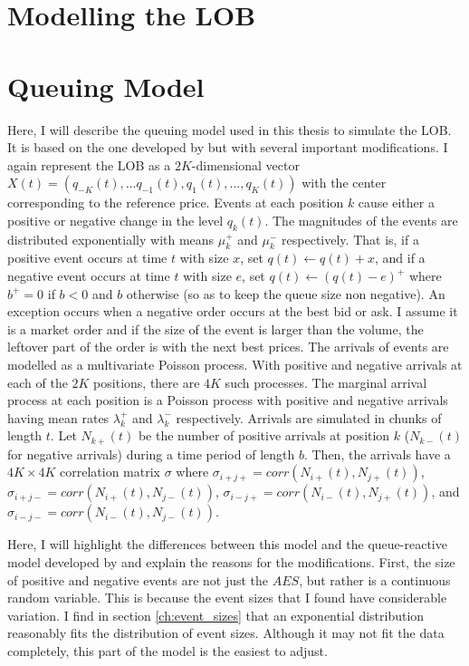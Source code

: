 \section{Modelling the LOB}

\section{Queuing Model}\label{ch:queue_model}
Here, I will describe the queuing model used in this thesis to simulate the LOB. It is based on the one developed by \cite{A6} but with several important modifications. I again represent the LOB as a $2K$-dimensional vector $X(t) = (q_{-K}(t), … q_{-1}(t), q_1(t), … , q_K(t))$ with the center corresponding to the reference price. Events at each position $k$ cause either a positive or negative change in the level $q_k(t)$. The magnitudes of the events are distributed exponentially with means $\mu^+_k$ and $\mu^-_k$ respectively. That is, if a positive event occurs at time $t$ with size $x$, set $q(t) \leftarrow q(t) + x$, and if a negative event occurs at time $t$ with size $e$, set $q(t) \leftarrow (q(t) - e)^+$ where $b^+ = 0$ if $b < 0$ and $b$ otherwise (so as to keep the queue size non negative). An exception occurs when a negative order occurs at the best bid or ask. I assume it is a market order and if the size of the event is larger than the volume, the leftover part of the order is with the next best prices. The arrivals of events are modelled as a multivariate Poisson process. With positive and negative arrivals at each of the $2K$ positions, there are $4K$ such processes. The marginal arrival process at each position is a Poisson process with positive and negative arrivals having mean rates $\lambda^+_k$ and $\lambda^-_k$ respectively. Arrivals are simulated in chunks of length $t$. Let $N_{k+}(t)$ be the number of positive arrivals at position $k$ ($N_{k-}(t)$ for negative arrivals) during a time period of length $b$. Then, the arrivals have a $4K\times4K$ correlation matrix $\sigma$ where $\sigma_{i+j+} = corr(N_{i+}(t), N_{j+}(t))$, $\sigma_{i+j-} = corr(N_{i+}(t), N_{j-}(t))$, $\sigma_{i-j+} = corr(N_{i-}(t), N_{j+}(t))$, and $\sigma_{i-j-} = corr(N_{i-}(t), N_{j-}(t))$.

Here, I will highlight the differences between this model and the queue-reactive model developed by \cite{A6} and explain the reasons for the modifications. First, the size of positive and negative events are not just the $AES$, but rather is a continuous random variable. This is because the event sizes that I found have considerable variation. I find in section \ref{ch:event_sizes} that an exponential distribution reasonably fits the distribution of event sizes. Although it may not fit the data completely, this part of the model is the easiest to adjust.

